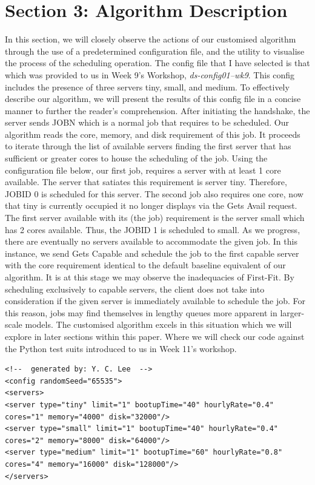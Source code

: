 \documentclass[a4paper]{article} %
\begin{document}
\section{Section 3: Algorithm Description}
\label{sec:section3}
In this section, we will closely observe the actions of our customised algorithm through the use of a predetermined configuration file, and the \textbf{} utility to visualise the process of the scheduling operation. The config file that I have selected is that which was provided to us in Week 9's Workshop, \textit{ds-config01--wk9}. This config includes the presence of three servers tiny, small, and medium. To effectively describe our algorithm, we will present the results of this config file in a concise manner to further the reader's comprehension. After initiating the handshake, the server sends JOBN which is a normal job that requires to be scheduled. Our algorithm reads the core, memory, and disk requirement of this job. It proceeds to iterate through the list of available servers finding the first server that has sufficient or greater cores to house the scheduling of the job. Using the configuration file below, our first job, requires a server with at least 1 core available. The server that satiates this requirement is server tiny. Therefore, JOBID 0 is scheduled for this server. The second job also requires one core, now that tiny is currently occupied it no longer displays via the Gets Avail request. The first server available with its (the job) requirement is the server small which has 2 cores available. Thus, the JOBID 1 is scheduled to small. As we progress, there are eventually no servers available to accommodate the given job. In this instance, we send Gets Capable and schedule the job to the first capable server with the core requirement identical to the default baseline equivalent of our algorithm. It is at this stage we may observe the inadequacies of First-Fit. By scheduling exclusively to capable servers, the client does not take into consideration if the given server is immediately available to schedule the job. For this reason, jobs may find themselves in lengthy queues more apparent in larger-scale models. The customised algorithm excels in this situation which we will explore in later sections within this paper. Where we will check our code against the Python test suits introduced to us in Week 11's workshop.

\begin{verbatim}
<!--  generated by: Y. C. Lee  -->
<config randomSeed="65535">
<servers>
<server type="tiny" limit="1" bootupTime="40" hourlyRate="0.4" cores="1" memory="4000" disk="32000"/>
<server type="small" limit="1" bootupTime="40" hourlyRate="0.4" cores="2" memory="8000" disk="64000"/>
<server type="medium" limit="1" bootupTime="60" hourlyRate="0.8" cores="4" memory="16000" disk="128000"/>
</servers>
\end{verbatim}
\end{document}
